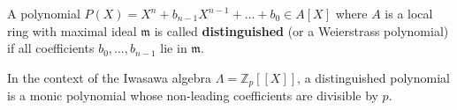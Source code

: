 A polynomial $P(X) = X^n + b_{n-1} X^{n-1} + \dots + b_0 \in A[X]$ where $A$ is a local ring with maximal ideal $\mathfrak{m}$ is called \textbf{distinguished} (or a Weierstrass polynomial) if all coefficients $b_0, \dots, b_{n-1}$ lie in $\mathfrak{m}$.

In the context of the Iwasawa algebra $\Lambda = \mathbb{Z}_p[[X]]$, a distinguished polynomial is a monic polynomial whose non-leading coefficients are divisible by $p$.
